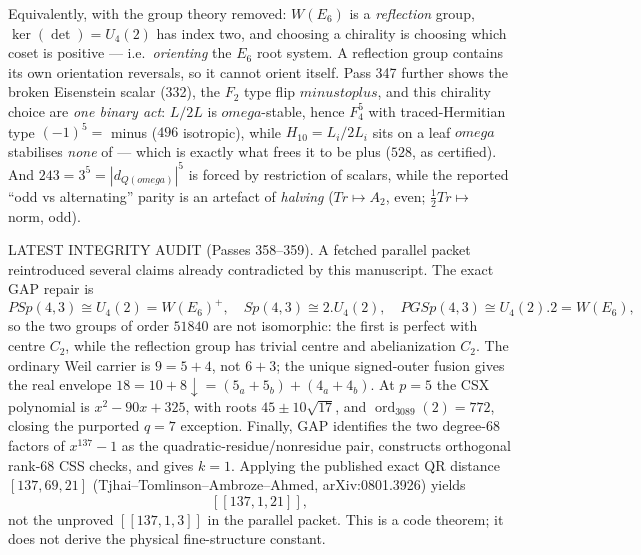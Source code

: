 \documentclass[12pt,a4paper]{article}
\def\mathrm#1{#1}%
\def\mathbf#1{#1}%
\def\textbf#1{#1}%
\def\omega{omega}%
\def\to{ to }%
\theoremstyle{definition}
\newcommand{\Sp}{\mathrm{Sp}}
\newcommand{\PSp}{\mathrm{PSp}}
\newcommand{\PGSp}{\mathrm{PGSp}}
\begin{document}
\begin{center}
{{\smallskip
Equivalently, with the group theory removed: $W(E_6)$ is a \emph{reflection}
group, $\ker(\det)=U_4(2)$ has index two, and choosing a chirality is choosing
which coset is positive --- i.e.\ \emph{orienting} the $E_6$ root system.
\textbf{A reflection group contains its own orientation reversals, so it cannot
orient itself.} Pass 347 further shows the broken Eisenstein scalar (332), the
$\mathbf F_2$ type flip $\mathrm{minus}\to\mathrm{plus}$, and this chirality
choice are \emph{one binary act}: $L/2L$ is $\omega$-stable, hence $\mathbf F_4^5$
with traced-Hermitian type $(-1)^5=$ minus ($496$ isotropic), while
$H_{10}=L_i/2L_i$ sits on a leaf $\omega$ stabilises \emph{none} of --- which is
exactly what frees it to be plus ($528$, as certified). And $243=3^5=|d_{\mathbf
Q(\omega)}|^{5}$ is forced by restriction of scalars, while the reported
``odd vs alternating'' parity is an artefact of \emph{halving}
($\mathrm{Tr}\mapsto A_2$, even; $\tfrac12\mathrm{Tr}\mapsto$ norm, odd).

\smallskip
\textbf{LATEST INTEGRITY AUDIT (Passes 358--359).}  A fetched parallel packet
reintroduced several claims already contradicted by this manuscript.  The exact
GAP repair is
\[
 \PSp(4,3)\cong U_4(2)=W(E_6)^+,
 \quad \Sp(4,3)\cong2.U_4(2),
 \quad \PGSp(4,3)\cong U_4(2).2=W(E_6),
\]
so the two groups of order $51840$ are not isomorphic: the first is perfect
with centre $C_2$, while the reflection group has trivial centre and
abelianization $C_2$.  The ordinary Weil carrier is $9=5+4$, not $6+3$;
the unique signed-outer fusion gives the real envelope
$18=10+8\downarrow=(5_a+5_b)+(4_a+4_b)$.  At $p=5$ the CSX polynomial is
$x^2-90x+325$, with roots $45\pm10\sqrt{17}$, and
$\operatorname{ord}_{3089}(2)=772$, closing the purported $q=7$ exception.
Finally, GAP identifies the two degree-$68$ factors of $x^{137}-1$ as the
quadratic-residue/nonresidue pair, constructs orthogonal rank-$68$ CSS checks,
and gives $k=1$.  Applying the published exact QR distance
$[137,69,21]$ (Tjhai--Tomlinson--Ambroze--Ahmed, arXiv:0801.3926) yields
\[
 \boxed{[[137,1,21]]},
\]
not the unproved $[[137,1,3]]$ in the parallel packet.  This is a code theorem;
it does not derive the physical fine-structure constant.

}}
\end{center}
\end{document}
